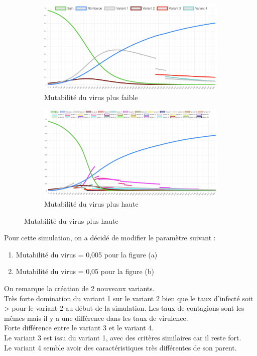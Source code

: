 \documentclass{article}
\begin{document}
\begin{figure}[h]
  \begin{subfigure}{.5\textwidth}
  \centering
  \includegraphics[width=1\linewidth]{images/Simulation2.png}
  \caption{Mutabilité du virus plus faible}
  \label{fig:sub1}
\end{subfigure}%
\begin{subfigure}{.5\textwidth}
  \centering
  \includegraphics[width=1\linewidth]{images/Simulation2_2.png}
  \caption{Mutabilité du virus plus haute}
  \label{fig:sub2}
\end{subfigure}
\end{figure}

Pour cette simulation, on a décidé de modifier le paramètre suivant :
\begin{enumerate}
    \item Mutabilité du virus = 0,005 pour la figure (a)
    \item Mutabilité du virus = 0,05 pour la figure (b) \\
\end{enumerate}
\noindent
On remarque la création de 2 nouveaux variants. \\

Très forte domination du variant 1 sur le variant 2 bien que le taux d'infecté soit > pour le variant 2 au début de la simulation. Les taux de contagions sont les mêmes mais il y a une différence dans les taux de virulence. \\
Forte différence entre le variant 3 et le variant 4. \\ Le variant 3 est issu du variant 1, avec des critères similaires car il reste fort. \\ Le variant 4 semble avoir des caractéristiques très différentes de son parent. \\
\end{document}
